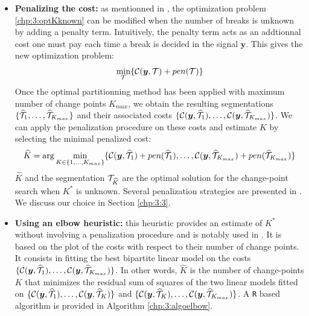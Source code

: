 \begin{itemize}
\item \textbf{Penalizing the cost:} as mentionned in \cite{truong2020}, the optimization problem \ref{chp:3:optKknown} can be modified when the number of breaks is unknown by adding a penalty term. Intuitively, the penalty term acts as an addtionnal cost one must pay each time a break is decided in the signal $\bm y$. This gives the new optimization problem: 
\begin{equation}\label{chp:3:optKnknown}
\min_{{\mathcal T}} \{ \mathcal{C}(\bm y,{\mathcal T}) + pen({\mathcal T}) \} 
\end{equation}   
Once the optimal partitionning method has been applied with maximum number of change points $K_{max}$, we obtain the resulting segmentations $\{\widehat{{\mathcal T}}_1,\dots,\widehat{{\mathcal T}}_{K_{max}}\}$ and their associated costs $\{{\mathcal C}(\bm y, \widehat{{\mathcal T}}_1),\dots,{\mathcal C}(\bm y, \widehat{{\mathcal T}}_{K_{max}})\}$. We can apply the penalization procedure on these costs and estimate $K$ by selecting the minimal penalized cost:
\begin{equation}\label{chp:3:Khat}
\widehat{K} = \arg\min_{K \in \{1,\dots,K_{max}\}} \{{\mathcal C}(\bm y, \widehat{{\mathcal T}}_1)+pen(\widehat{{\mathcal T}}_1),\dots,{\mathcal C}(\bm y, \widehat{{\mathcal T}}_{K_{max}})+pen(\widehat{{\mathcal T}}_{K_{max}})\} 
\end{equation}
$\widehat{K}$ and the segmentation ${\mathcal T}_{\widehat{K}}$ are the optimal solution for the change-point search when $K^*$ is unknown. Several penalization strategies are presented in \cite{truong2020}. We discuss our choice in Section \ref{chp:3:3}.  
\item \textbf{Using an elbow heuristic:} this heuristic provides an estimate of $K^*$ without involving a penalization procedure and is notably used in \cite{lung2015}. It is based on the plot of the costs with respect to their number of change points. It consists in fitting the best bipartite linear model on the costs $\{{\mathcal C}(\bm y, \widehat{{\mathcal T}}_1),\dots,{\mathcal C}(\bm y, \widehat{{\mathcal T}}_{K_{max}})\}$. In other words, $\widehat{K}$ is the number of change-points $K$ that minimizes the residual sum of squares of the two linear models fitted on $\{{\mathcal C}(\bm y, \widehat{{\mathcal T}}_1),\dots,{\mathcal C}(\bm y, \widehat{{\mathcal T}}_{K})\}$ and $\{{\mathcal C}(\bm y, \widehat{{\mathcal T}}_K),\dots,{\mathcal C}(\bm y, \widehat{{\mathcal T}}_{K_{max}})\}$. A \texttt{R} based algorithm is provided in Algorithm \ref{chp:3:algoelbow}.
\end{itemize}    

